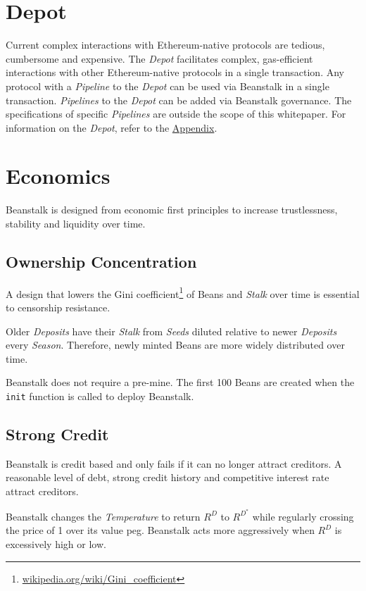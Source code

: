 \documentclass[tikz]{article}
\newcommand{\code}[1]{\texttt{#1}}
\newcommand{\term}[1]{\textsl{#1}}
\newcommand{\fref}[1]{\footnote{\href{http://#1}{#1}}}
\newcommand{\Bean}{} %
\begin{document}
\section{Depot}
Current complex interactions with Ethereum-native protocols are tedious, cumbersome and expensive. The \term{Depot} facilitates complex, gas-efficient interactions with other Ethereum-native protocols in a single transaction. Any protocol with a \term{Pipeline} to the \term{Depot} can be used via Beanstalk in a single transaction. \term{Pipelines} to the \term{Depot} can be added via Beanstalk governance. The specifications of specific \term{Pipelines} are outside the scope of this whitepaper. For information on the \term{Depot}, refer to the \hyperlink{section.14}{Appendix}.

\section{Economics}
Beanstalk is designed from economic first principles to increase trustlessness, stability and liquidity over time.

\vspace*{-1.75mm}
\subsection{Ownership Concentration}
\vspace*{-1.75mm}
A design that lowers the Gini coefficient\fref{wikipedia.org/wiki/Gini\_coefficient} of Beans and \term{Stalk} over time is essential to censorship resistance.

Older \term{Deposits} have their \term{Stalk} from \term{Seeds} diluted relative to newer \term{Deposits} every \term{Season}. Therefore, newly minted Beans are more widely distributed over time.

Beanstalk does not require a pre-mine. The first 100 Beans are created when the \code{init} function is called to deploy Beanstalk.

\vspace*{-1.75mm}
\subsection{Strong Credit}
\vspace*{-1.75mm}
Beanstalk is credit based and only fails if it can no longer attract creditors. A reasonable level of debt, strong credit history and competitive interest rate attract creditors. 

Beanstalk changes the \term{Temperature} to return \hyperlink{ht156}{$R^D$} to $R^{D^*}$ while regularly crossing the price of \Bean1 over its value peg. Beanstalk acts more aggressively when \hyperlink{ht156}{$R^D$} is excessively high or low.
\end{document}
